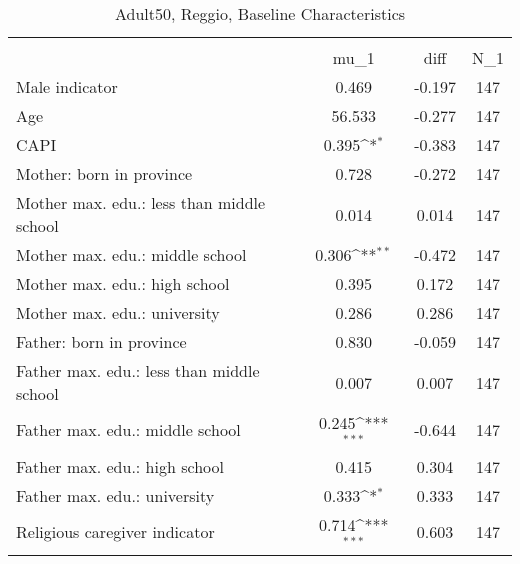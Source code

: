 \begin{table}[htbp]\centering
\def\sym#1{\ifmmode^{#1}\else\(^{#1}\)\fi}
\caption{Adult50, Reggio, Baseline Characteristics}
\begin{tabular}{l*{1}{ccc}}
\toprule
                    &\multicolumn{3}{c}{}                           \\
                    &        mu\_1         &        diff&         N\_1\\
\midrule
Male indicator      &       0.469         &      -0.197&         147\\
Age                 &      56.533         &      -0.277&         147\\
CAPI                &       0.395\sym{*}  &      -0.383&         147\\
Mother: born in province&       0.728         &      -0.272&         147\\
Mother max. edu.: less than middle school&       0.014         &       0.014&         147\\
Mother max. edu.: middle school&       0.306\sym{**} &      -0.472&         147\\
Mother max. edu.: high school&       0.395         &       0.172&         147\\
Mother max. edu.: university&       0.286         &       0.286&         147\\
Father: born in province&       0.830         &      -0.059&         147\\
Father max. edu.: less than middle school&       0.007         &       0.007&         147\\
Father max. edu.: middle school&       0.245\sym{***}&      -0.644&         147\\
Father max. edu.: high school&       0.415         &       0.304&         147\\
Father max. edu.: university&       0.333\sym{*}  &       0.333&         147\\
Religious caregiver indicator&       0.714\sym{***}&       0.603&         147\\
\bottomrule
\end{tabular}
\end{table}
